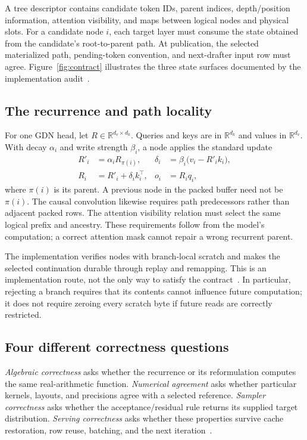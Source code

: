 \documentclass[conference]{IEEEtran}
\begin{document}
A tree descriptor contains candidate token IDs, parent indices, depth/position information, attention visibility, and maps between logical nodes and physical slots. For a candidate node $i$, each target layer must consume the state obtained from the candidate's root-to-parent path. At publication, the selected materialized path, pending-token convention, and next-drafter input row must agree. Figure~\ref{fig:contract} illustrates the three state surfaces documented by the implementation audit~\cite{lumo2026stateless,lumo2026archive}.

\subsection{The recurrence and path locality}
For one GDN head, let $R\in\mathbb{R}^{d_v\times d_k}$. Queries and keys are in $\mathbb{R}^{d_k}$ and values in $\mathbb{R}^{d_v}$. With decay $\alpha_i$ and write strength $\beta_i$, a node applies the standard update~\cite{yang2024gated}
\begin{align}
R'_i &= \alpha_i R_{\pi(i)}, &
\delta_i &= \beta_i\bigl(v_i-R'_i k_i\bigr),\\
R_i &= R'_i+\delta_i k_i^\top, &
o_i &= R_iq_i,
\end{align}
where $\pi(i)$ is its parent. A previous node in the packed buffer need not be $\pi(i)$. The causal convolution likewise requires path predecessors rather than adjacent packed rows. The attention visibility relation must select the same logical prefix and ancestry. These requirements follow from the model's computation; a correct attention mask cannot repair a wrong recurrent parent.

The implementation verifies nodes with branch-local scratch and makes the selected continuation durable through replay and remapping. This is an implementation route, not the only way to satisfy the contract~\cite{lumo2026receipts,lumo2026stateless}. In particular, rejecting a branch requires that its contents cannot influence future computation; it does not require zeroing every scratch byte if future reads are correctly restricted.

\subsection{Four different correctness questions}
\textit{Algebraic correctness} asks whether the recurrence or its reformulation computes the same real-arithmetic function. \textit{Numerical agreement} asks whether particular kernels, layouts, and precisions agree with a selected reference. \textit{Sampler correctness} asks whether the acceptance/residual rule returns its supplied target distribution. \textit{Serving correctness} asks whether these properties survive cache restoration, row reuse, batching, and the next iteration~\cite{yang2024delta,chen2023sampling,lumo2026archive}.
\end{document}
